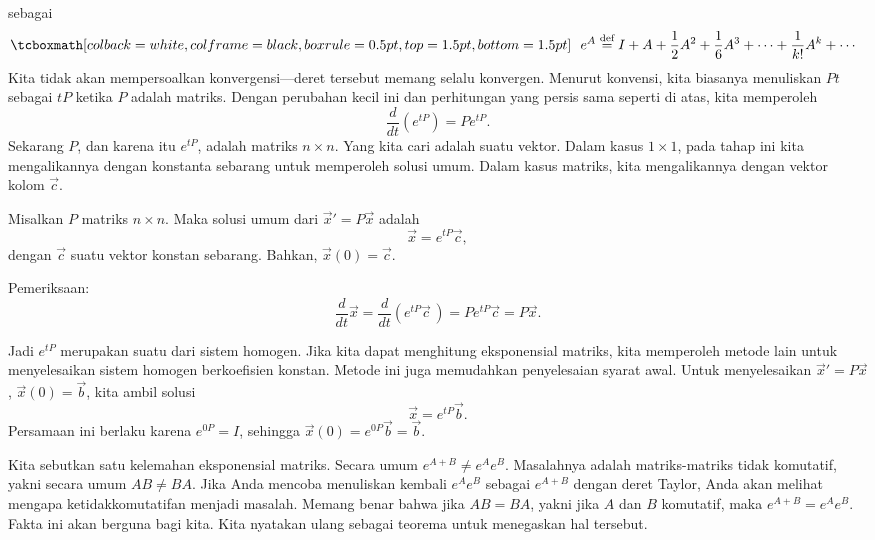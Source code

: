 \emph{} sebagai
\begin{equation*}
\mybxbg{~~
e^A \overset{\text{def}}{=} I + A + \frac{1}{2} A^2 + 
\frac{1}{6} A^3 + \cdots + \frac{1}{k!} A^k + \cdots
~~}
\end{equation*}
Kita tidak akan mempersoalkan konvergensi---deret tersebut memang
selalu konvergen.
Menurut konvensi, kita biasanya menuliskan $Pt$ sebagai $tP$ ketika $P$ adalah matriks.
Dengan perubahan kecil ini dan perhitungan yang persis sama
seperti di atas,
kita memperoleh
\begin{equation*}
\frac{d}{dt} \left(e^{tP} \right) = 
P e^{tP} .
\end{equation*}
Sekarang $P$, dan karena itu $e^{tP}$, adalah matriks $n \times n$.  Yang kita cari
adalah suatu vektor.  Dalam kasus $1 \times 1$, pada tahap ini kita
mengalikannya dengan konstanta sebarang untuk memperoleh solusi umum.  Dalam kasus
matriks, kita mengalikannya dengan vektor kolom $\vec{c}$.

\begin{theorem}
Misalkan $P$ matriks $n \times n$.  Maka solusi umum dari
${\vec{x}}' = P \vec{x}$ adalah
\begin{equation*}
\vec{x} = e^{tP} \vec{c} ,
\end{equation*}
dengan $\vec{c}$ suatu vektor konstan sebarang.  Bahkan, $\vec{x}(0) =
\vec{c}$.
\end{theorem}

Pemeriksaan:
\begin{equation*}
\frac{d}{dt}
\vec{x} =
\frac{d}{dt} \left( 
e^{tP} \vec{c}\, \right)
=
P e^{tP} \vec{c} =
P \vec{x}.
\end{equation*}

Jadi $e^{tP}$ merupakan suatu 
dari sistem homogen.
Jika kita dapat menghitung eksponensial matriks,
kita memperoleh metode lain untuk menyelesaikan sistem homogen
berkoefisien konstan.  Metode ini juga memudahkan penyelesaian syarat awal.  Untuk menyelesaikan 
${\vec{x}}' = P \vec{x}$, $\vec{x}(0) = \vec{b}$, kita ambil solusi
\begin{equation*}
\vec{x} = e^{tP} \vec{b} .
\end{equation*}
Persamaan ini berlaku karena $e^{0P} = I$,
sehingga $\vec{x} (0) = e^{0P} \vec{b} = \vec{b}$.

\medskip

Kita sebutkan satu kelemahan eksponensial matriks.
Secara umum $e^{A+B} \neq e^A e^B$.  Masalahnya adalah matriks-matriks tidak
komutatif, yakni secara umum $AB \neq BA$.
Jika Anda mencoba menuliskan kembali $e^A e^B$ sebagai $e^{A+B}$ dengan deret Taylor,
Anda akan melihat mengapa ketidakkomutatifan menjadi masalah.
Memang benar bahwa jika
$AB = BA$, yakni jika $A$ dan $B$ komutatif, maka $e^{A+B} = e^Ae^B$.  Fakta ini akan
berguna bagi kita.  Kita nyatakan ulang sebagai teorema untuk menegaskan hal tersebut.


